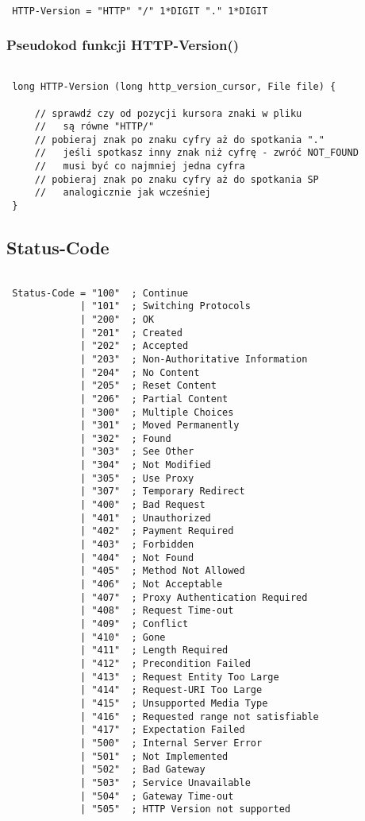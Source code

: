 \documentclass[a4paper,11pt]{report}
\begin{document}
\begin{lstlisting}

 HTTP-Version = "HTTP" "/" 1*DIGIT "." 1*DIGIT

\end{lstlisting}

\subsubsection{Pseudokod funkcji HTTP-Version()}

\begin{lstlisting}

 long HTTP-Version (long http_version_cursor, File file) {
     
     // sprawdź czy od pozycji kursora znaki w pliku
     //   są równe "HTTP/"
     // pobieraj znak po znaku cyfry aż do spotkania "."
     //   jeśli spotkasz inny znak niż cyfrę - zwróć NOT_FOUND
     //   musi być co najmniej jedna cyfra
     // pobieraj znak po znaku cyfry aż do spotkania SP
     //   analogicznie jak wcześniej
 }

\end{lstlisting}

\subsection{Status-Code}

\begin{lstlisting}

 Status-Code = "100"  ; Continue
             | "101"  ; Switching Protocols
             | "200"  ; OK
             | "201"  ; Created
             | "202"  ; Accepted
             | "203"  ; Non-Authoritative Information
             | "204"  ; No Content
             | "205"  ; Reset Content
             | "206"  ; Partial Content
             | "300"  ; Multiple Choices
             | "301"  ; Moved Permanently
             | "302"  ; Found
             | "303"  ; See Other
             | "304"  ; Not Modified
             | "305"  ; Use Proxy
             | "307"  ; Temporary Redirect
             | "400"  ; Bad Request
             | "401"  ; Unauthorized
             | "402"  ; Payment Required
             | "403"  ; Forbidden
             | "404"  ; Not Found
             | "405"  ; Method Not Allowed
             | "406"  ; Not Acceptable
             | "407"  ; Proxy Authentication Required
             | "408"  ; Request Time-out
             | "409"  ; Conflict
             | "410"  ; Gone
             | "411"  ; Length Required
             | "412"  ; Precondition Failed
             | "413"  ; Request Entity Too Large
             | "414"  ; Request-URI Too Large
             | "415"  ; Unsupported Media Type
             | "416"  ; Requested range not satisfiable
             | "417"  ; Expectation Failed
             | "500"  ; Internal Server Error
             | "501"  ; Not Implemented
             | "502"  ; Bad Gateway
             | "503"  ; Service Unavailable
             | "504"  ; Gateway Time-out
             | "505"  ; HTTP Version not supported

\end{lstlisting}
\end{document}
